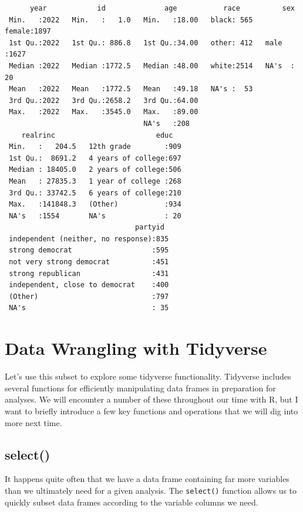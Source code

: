 \documentclass[
  letterpaper,
  DIV=11,
  numbers=noendperiod]{scrreprt}
\begin{document}
\begin{verbatim}
      year            id              age           race          sex      
 Min.   :2022   Min.   :   1.0   Min.   :18.00   black: 565   female:1897  
 1st Qu.:2022   1st Qu.: 886.8   1st Qu.:34.00   other: 412   male  :1627  
 Median :2022   Median :1772.5   Median :48.00   white:2514   NA's  :  20  
 Mean   :2022   Mean   :1772.5   Mean   :49.18   NA's :  53                
 3rd Qu.:2022   3rd Qu.:2658.2   3rd Qu.:64.00                             
 Max.   :2022   Max.   :3545.0   Max.   :89.00                             
                                 NA's   :208                               
    realrinc                        educ    
 Min.   :   204.5   12th grade        :909  
 1st Qu.:  8691.2   4 years of college:697  
 Median : 18405.0   2 years of college:506  
 Mean   : 27835.3   1 year of college :268  
 3rd Qu.: 33742.5   6 years of college:210  
 Max.   :141848.3   (Other)           :934  
 NA's   :1554       NA's              : 20  
                               partyid   
 independent (neither, no response):835  
 strong democrat                   :595  
 not very strong democrat          :451  
 strong republican                 :431  
 independent, close to democrat    :400  
 (Other)                           :797  
 NA's                              : 35  
\end{verbatim}

\section{Data Wrangling with
Tidyverse}\label{data-wrangling-with-tidyverse}

Let's use this subset to explore some tidyverse functionality. Tidyverse
includes several functions for efficiently manipulating data frames in
preparation for analyses. We will encounter a number of these throughout
our time with R, but I want to briefly introduce a few key functions and
operations that we will dig into more next time.

\subsection{select()}\label{select}

It happens quite often that we have a data frame containing far more
variables than we ultimately need for a given analysis. The
\texttt{select()} function allows us to quickly subset data frames
according to the variable columns we need.
\end{document}
